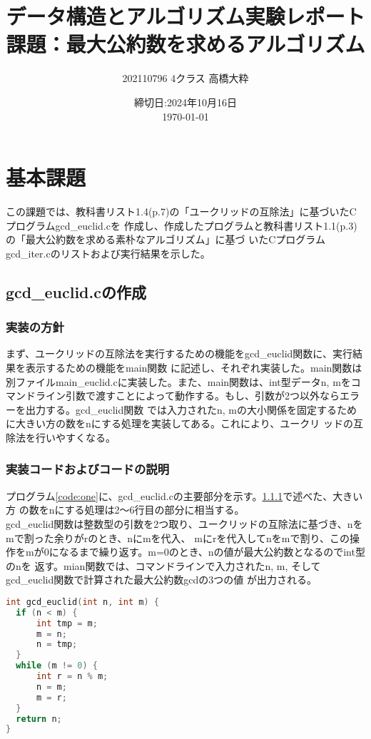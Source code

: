 \documentclass{ltjsarticle}
\begin{document}
\title{データ構造とアルゴリズム実験レポート\\
課題：最大公約数を求めるアルゴリズム}
\author{202110796 4クラス 高橋大粋}
\date{締切日:2024年10月16日\\
\today}
\maketitle

\section{基本課題}
この課題では、教科書リスト1.4(p.7)の「ユークリッドの互除法」に基づいたCプログラムgcd\_euclid.cを
作成し、作成したプログラムと教科書リスト1.1(p.3)の「最大公約数を求める素朴なアルゴリズム」に基づ
いたCプログラムgcd\_iter.cのリストおよび実行結果を示した。 
\subsection{gcd\_euclid.cの作成}
\subsubsection{実装の方針}\label{subsubsec:実装の方針1}
まず、ユークリッドの互除法を実行するための機能をgcd\_euclid関数に、実行結果を表示するための機能をmain関数
に記述し、それぞれ実装した。main関数は別ファイルmain\_euclid.cに実装した。また、main関数は、int型データn,
mをコマンドライン引数で渡すことによって動作する。もし、引数が2つ以外ならエラーを出力する。gcd\_euclid関数
では入力されたn, mの大小関係を固定するために大きい方の数をnにする処理を実装してある。これにより、ユークリ
ッドの互除法を行いやすくなる。
\subsubsection{実装コードおよびコードの説明}\label{subsubsec:実装コード及びコードの説明1}
プログラム\ref{code:one}に、gcd\_euclid.cの主要部分を示す。\ref{subsubsec:実装の方針1}で述べた、大きい方
の数をnにする処理は2～6行目の部分に相当する。\\ \indent
gcd\_euclid関数は整数型の引数を2つ取り、ユークリッドの互除法に基づき、nをmで割った余りがrのとき、nにmを代入、
mにrを代入してnをmで割り、この操作をmが0になるまで繰り返す。m=0のとき、nの値が最大公約数となるのでint型のnを
返す。mian関数では、コマンドラインで入力されたn, m, そしてgcd\_euclid関数で計算された最大公約数gcdの3つの値
が出力される。
\begin{lstlisting}[caption=gcd\_euclid.cの主要部, label=code:one, language=C]
int gcd_euclid(int n, int m) {
  if (n < m) {
      int tmp = m;
      m = n;
      n = tmp;
  }
  while (m != 0) {
      int r = n % m;
      n = m;
      m = r;
  }
  return n;
}
\end{lstlisting}
\end{document}
